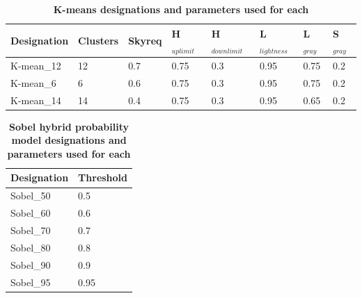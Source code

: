 \documentclass[final,3p,times,authoryear]{elsarticle}
\begin{document}
\begin{table}[!htbp]
\caption{\bf K-means designations and parameters used for each \label{tab:techniques3}}     
\begin{tabular}{ l l l l l l l l}
\textbf{Designation} & \textbf{Clusters} & \textbf{Skyreq}&\textbf{H$_{uplimit}$}&\textbf{H$_{downlimit}$} & \textbf{L$_{lightness}$} & \textbf{L$_{gray}$}& \textbf{S$_{gray}$} \\ \hline
K-mean\_12  & 12 & 0.7& 0.75& 0.3 & 0.95 & 0.75 & 0.2 \\
K-mean\_6  & 6 & 0.6& 0.75& 0.3 & 0.95 & 0.75 & 0.2 \\
K-mean\_14  & 14 & 0.4& 0.75& 0.3 & 0.95 & 0.65 & 0.2 \\
\hline
\end{tabular}
\end{table}

	
\begin{table}[!htbp]
\caption{\bf Sobel hybrid probability model designations and parameters used for each  \label{tab:techniques4}}     
\begin{tabular}{ l  l }
\textbf{Designation}  & \textbf{Threshold}    \\ \hline
Sobel\_50 & 0.5 \\	  
Sobel\_60 & 0.6 \\	
Sobel\_70 & 0.7 \\	
Sobel\_80 & 0.8 \\
Sobel\_90 & 0.9 \\
Sobel\_95 & 0.95 \\
\hline
\end{tabular}
\end{table}
\end{document}
